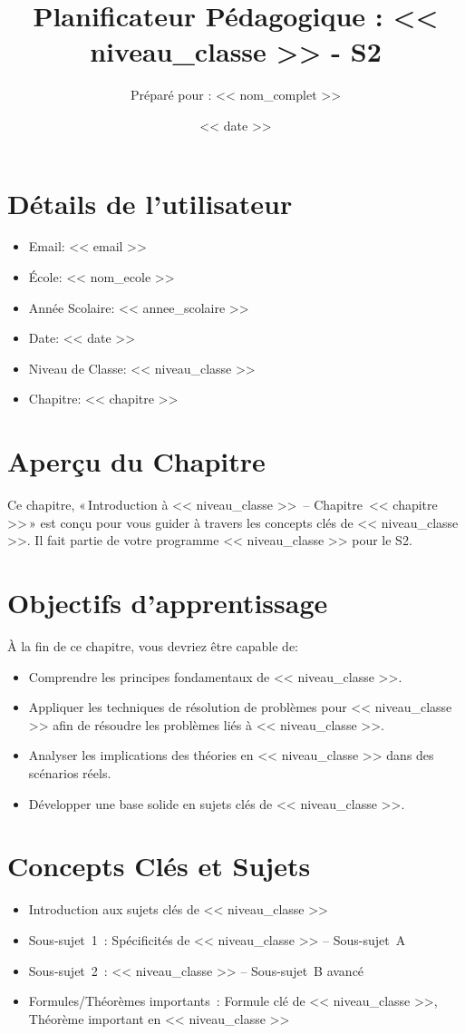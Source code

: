 \documentclass{article}
\title{Planificateur Pédagogique : << niveau_classe >> - S2}
\author{Préparé pour : << nom_complet >>}
\date{<< date >>}
\begin{document}
	
	\maketitle
	
	\section*{Détails de l'utilisateur}
	\begin{itemize}
		\item Email: << email >>
		\item École: << nom_ecole >>
		\item Année Scolaire: << annee_scolaire >>
		\item Date: << date >>
		\item Niveau de Classe: << niveau_classe >>
		\item Chapitre: << chapitre >>
	\end{itemize}
	
	\section*{Aperçu du Chapitre}
	Ce chapitre, « Introduction à << niveau_classe >> – Chapitre << chapitre >> »  
	est conçu pour vous guider à travers les concepts clés de << niveau_classe >>.  
	Il fait partie de votre programme << niveau_classe >> pour le S2.
	
	\section*{Objectifs d'apprentissage}
	À la fin de ce chapitre, vous devriez être capable de:
	\begin{itemize}
		\item Comprendre les principes fondamentaux de << niveau_classe >>.
		\item Appliquer les techniques de résolution de problèmes pour << niveau_classe >> afin de résoudre les problèmes liés à << niveau_classe >>.
		\item Analyser les implications des théories en << niveau_classe >> dans des scénarios réels.
		\item Développer une base solide en sujets clés de << niveau_classe >>.
	\end{itemize}
	
	\section*{Concepts Clés et Sujets}
	\begin{itemize}
		\item Introduction aux sujets clés de << niveau_classe >>
		\item Sous-sujet 1 : Spécificités de << niveau_classe >> – Sous-sujet A
		\item Sous-sujet 2 : << niveau_classe >> – Sous-sujet B avancé
		\item Formules/Théorèmes importants : Formule clé de << niveau_classe >>, Théorème important en << niveau_classe >>
	\end{itemize}
	
\end{document}
